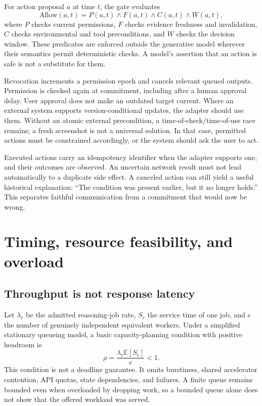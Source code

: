 \documentclass[11pt,letterpaper]{article}
\newcommand{\E}{\mathbb{E}}
\begin{document}
For action proposal $a$ at time $t$, the gate evaluates
\begin{equation}
 \mathrm{Allow}(a,t)=P(a,t)\land F(a,t)\land C(a,t)\land W(a,t),
 \label{eq:gate}
\end{equation}
where $P$ checks current permissions, $F$ checks evidence freshness and invalidation, $C$ checks environmental and tool preconditions, and $W$ checks the decision window. These predicates are enforced outside the generative model wherever their semantics permit deterministic checks. A model's assertion that an action is safe is not a substitute for them.

Revocation increments a permission epoch and cancels relevant queued outputs. Permission is checked again at commitment, including after a human approval delay. User approval does not make an outdated target current. Where an external system supports version-conditional updates, the adapter should use them. Without an atomic external precondition, a time-of-check/time-of-use race remains; a fresh screenshot is not a universal solution. In that case, permitted actions must be constrained accordingly, or the system should ask the user to act.

Executed actions carry an idempotency identifier when the adapter supports one, and their outcomes are observed. An uncertain network result must not lead automatically to a duplicate side effect. A canceled action can still yield a useful historical explanation: ``The condition was present earlier, but it no longer holds.'' This separates faithful communication from a commitment that would now be wrong.

\section{Timing, resource feasibility, and overload}
\subsection{Throughput is not response latency}
Let $\lambda_r$ be the admitted reasoning-job rate, $S_r$ the service time of one job, and $c$ the number of genuinely independent equivalent workers. Under a simplified stationary queueing model, a basic capacity-planning condition with positive headroom is
\begin{equation}
 \rho=\frac{\lambda_r\E[S_r]}{c}<1.
 \label{eq:capacity}
\end{equation}
This condition is not a deadline guarantee. It omits burstiness, shared accelerator contention, API quotas, state dependencies, and failures. A finite queue remains bounded even when overloaded by dropping work, so a bounded queue alone does not show that the offered workload was served.
\end{document}
